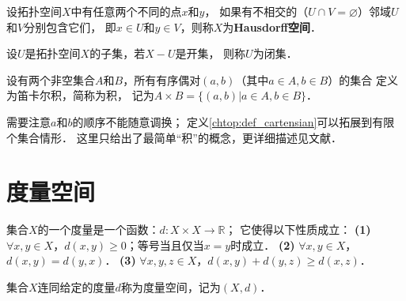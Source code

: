 \begin{definition}\label{chtop:def_Hausdorff}
    设拓扑空间$X$中有任意两个不同的点$x$和$y$，
    如果有不相交的（$U \cap V = \varnothing$）邻域$U$和$V$分别包含它们，
    即$x\in U$和$y\in V$，则称$X$为{\bfseries \heiti Hausdorff空间}．
     
\end{definition}





\begin{definition}\label{chtop:def_closedset}
    设$U$是拓扑空间$X$的子集，若$X-U$是开集，
    则称$U$为{\heiti 闭集}． 
\end{definition}


\begin{definition}\label{chtop:def_cartensian}
    设有两个非空集合$A$和$B$，所有有序偶对$(a,b)$（其中$a\in A, b\in B$）的集合
    定义为{\heiti 笛卡尔积}，简称为{\heiti 积}，
    记为$A \times B = \{(a,b)| a\in A, b\in B \}$．
\end{definition}
需要注意$a$和$b$的顺序不能随意调换；
定义\ref{chtop:def_cartensian}可以拓展到有限个集合情形．
这里只给出了最简单“积”的概念，更详细描述见文献\parencite[\S 1, \S5, \S 15, \S19]{munkres-2000-topology}．




\section{度量空间}
\begin{definition}\label{chtop:def_metric}
    集合$X$的一个{\heiti 度量}是一个函数：$d:X\times X \to \mathbb{R}$；
    它使得以下性质成立：
    {\bfseries (1)} $\forall x,y \in X$，$d(x,y) \geqslant 0$；等号当且仅当$x=y$时成立．
    {\bfseries (2)} $\forall x,y \in X$，$d(x,y) =d(y,x)$．
    {\bfseries (3)} $\forall x,y,z \in X$，$d(x,y) +d(y,z) \geqslant d(x,z)$．
\end{definition}

\begin{definition}
    集合$X$连同给定的度量$d$称为{\heiti 度量空间}，记为$(X,d)$．
\end{definition}

